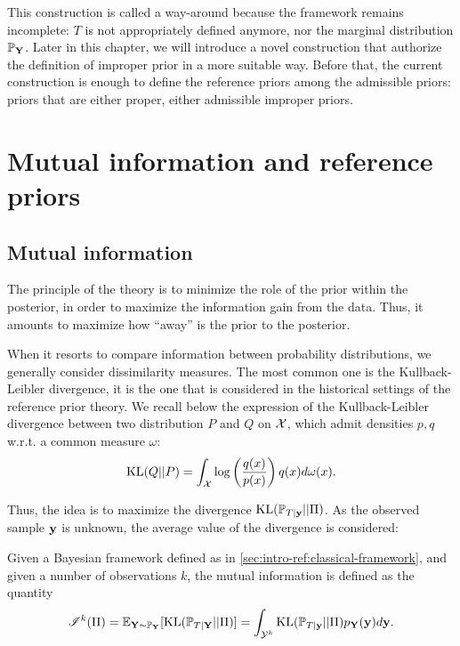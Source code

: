 This construction is called a way-around because the framework remains incomplete: $T$ is not appropriately defined anymore, nor the marginal distribution $\mathbb{P}_{\mathbf{Y}}$. Later in this chapter, we will introduce a novel construction that authorize the definition of improper prior in a more suitable way.
Before that, the current construction is enough to define the reference priors among the admissible priors: priors that are either proper, either admissible improper priors.



\section{Mutual information and reference priors}\label{sec:intro-ref:mutalinfo-ref-priors}

\subsection{Mutual information}\label{sec:intro-ref:mutualinfo}


The principle of the theory 
is to minimize the role of the prior within the posterior, in order to maximize the information gain from the data.
Thus, it amounts to maximize how ``away'' is the prior to the posterior.

When it resorts to compare information between probability distributions, we generally consider dissimilarity measures. The most common one is the Kullback-Leibler divergence, it is the one that is considered in the historical settings of the reference prior theory.
We recall below the expression of the Kullback-Leibler divergence between two distribution $P$ and $Q$ on $\mathcal{X}$, which admit densities $p,q$ w.r.t. a common measure $\omega$:
    \begin{equation}
        \text{KL}(Q||P)=\int_{\mathcal{X}}\log\left(\frac{q(x)}{p(x)}\right)q(x)d\omega(x).
    \end{equation}

Thus, the idea is to maximize the divergence $\text{KL}(\mathbb{P}_{T|\mathbf{y}}||\Pi)$. As the observed sample $\mathbf{y}$ is unknown, the average value of the divergence is considered:
\begin{defi}\label{def:intro-ref-MI}
    Given a Bayesian framework defined as in \cref{sec:intro-ref:classical-framework}, and given a number of observations $k$, the mutual information is defined as the quantity
    \begin{equation}
        \mathscr{I}^k(\Pi) =  \mathbb{E}_{\mathbf{Y}\sim \mathbb{P}_{\mathbf{Y}}}[\text{KL}(\mathbb{P}_{T|\mathbf{Y}}||\Pi)] =  \int_{\mathcal{Y}^k}\text{KL}(\mathbb{P}_{T|\mathbf{y}}||\Pi) p_{\mathbf{Y}}(\mathbf{y})d\mathbf{y}.
    \end{equation}
\end{defi}


